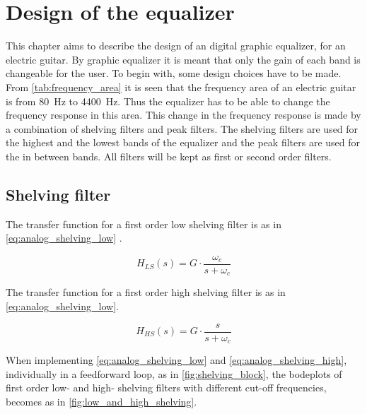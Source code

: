 \section{Design of the equalizer}\label{sec:design:eq}
This chapter aims to describe the design of an digital graphic equalizer, for an electric guitar. By graphic equalizer it is meant that only the gain of each band is changeable for the user.  
To begin with, some design choices have to be made. From \autoref{tab:frequency_area} it is seen that the frequency area of an electric guitar is from \SI{80}{\hertz} to \SI{4400}{\hertz}. Thus the equalizer has to be able to change the frequency response in this area. This change in the frequency response is made by a combination of shelving filters and peak filters. The shelving filters are used for the highest and the lowest bands of the equalizer and the peak filters are used for the in between bands. All filters will be kept as first or second order filters. 

\subsection{Shelving filter}
The transfer function for a first order low shelving filter is as in \autoref{eq:analog_shelving_low} \citep{Julius_smith}.

\begin{equation}\label{eq:analog_shelving_low}
        H_{LS}(s) = G \cdot \frac{\omega_c}{s+\omega_c}
    \end{equation}

    \startexplain
    \stopexplain
    
The transfer function for a first order high shelving filter is as in \autoref{eq:analog_shelving_low}.

\begin{equation}\label{eq:analog_shelving_high}
        H_{HS}(s) = G \cdot \frac{s}{s+\omega_c}
    \end{equation}

    \startexplain
    \stopexplain

    
When implementing \autoref{eq:analog_shelving_low} and \autoref{eq:analog_shelving_high}, individually in a feedforward loop, as in \autoref{fig:shelving_block}, the bodeplots of first order low- and high- shelving filters with different cut-off frequencies, becomes as in \autoref{fig:low_and_high_shelving}.

